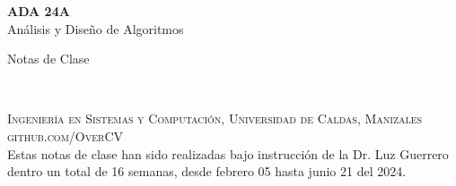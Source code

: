 \documentclass[tikz,11pt,fleqn]{book} %
\begin{document}
\newcommand{\floor}[1]{\left\lfloor #1 \right\rfloor}
\newcommand{\ceil}[1]{\left\lceil #1 \right\rceil}
\newcommand{\br}[1]{\left( #1 \right)}




\begingroup
\thispagestyle{empty}
\centering
\vspace*{5cm}
\par\normalfont\fontsize{35}{35}\sffamily\selectfont
\textbf{ADA 24A}\\
{\LARGE Análisis y Diseño de Algoritmos}\par %
\vspace*{1cm}
{\Huge Notas de Clase}\par %
\endgroup


\newpage
~\vfill
\thispagestyle{empty}


\noindent \textsc{Ingeniería en Sistemas y Computación, Universidad de Caldas, Manizales}\\

\noindent \textsc{github.com/OverCV}\\ %

\noindent Estas notas de clase han sido realizadas bajo instrucción de la Dr. Luz Guerrero dentro un total de 16 semanas, desde febrero 05 hasta junio 21 del 2024.\\ %
\end{document}
